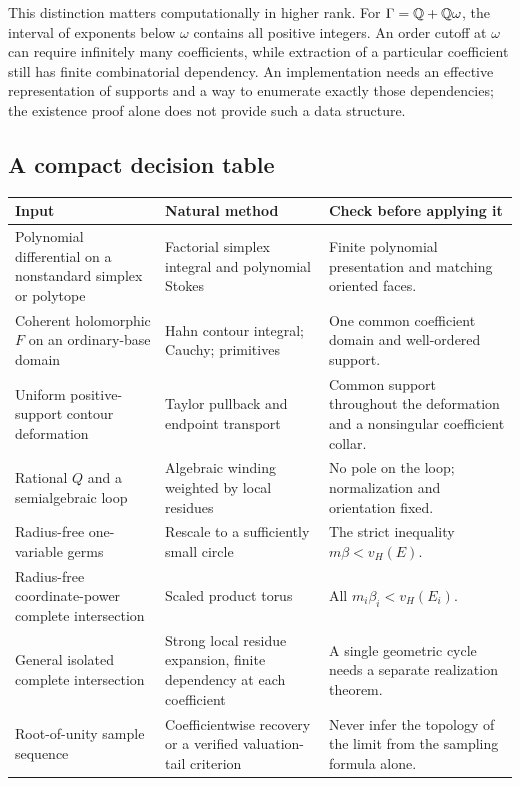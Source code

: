 \documentclass[11pt,letterpaper]{article}
\theoremstyle{definition}
\theoremstyle{remark}
\newcommand{\vH}{v_{\!H}}\newcommand{\re}{\operatorname{Re}}\newcommand{\im}{\operatorname{Im}}
\numberwithin{equation}{section}
\begin{document}
This distinction matters computationally in higher rank. For $\Gamma=\mathbb Q+\mathbb Q\omega$, the interval of exponents below $\omega$ contains all positive integers. An order cutoff at $\omega$ can require infinitely many coefficients, while extraction of a particular coefficient still has finite combinatorial dependency. An implementation needs an effective representation of supports and a way to enumerate exactly those dependencies; the existence proof alone does not provide such a data structure.

\subsection{A compact decision table}
\begin{center}\small
\begin{longtable}{@{}L{0.29\textwidth}L{0.35\textwidth}L{0.26\textwidth}@{}}
\toprule
Input & Natural method & Check before applying it\\\midrule\endhead
Polynomial differential on a nonstandard simplex or polytope & Factorial simplex integral and polynomial Stokes & Finite polynomial presentation and matching oriented faces.\\[0.45em]
Coherent holomorphic $F$ on an ordinary-base domain & Hahn contour integral; Cauchy; primitives & One common coefficient domain and well-ordered support.\\[0.45em]
Uniform positive-support contour deformation & Taylor pullback and endpoint transport & Common support throughout the deformation and a nonsingular coefficient collar.\\[0.45em]
Rational $Q$ and a semialgebraic loop & Algebraic winding weighted by local residues & No pole on the loop; normalization and orientation fixed.\\[0.45em]
Radius-free one-variable germs & Rescale to a sufficiently small circle & The strict inequality $m\beta<\vH(E)$.\\[0.45em]
Radius-free coordinate-power complete intersection & Scaled product torus & All $m_i\beta_i<\vH(E_i)$.\\[0.45em]
General isolated complete intersection & Strong local residue expansion, finite dependency at each coefficient & A single geometric cycle needs a separate realization theorem.\\[0.45em]
Root-of-unity sample sequence & Coefficientwise recovery or a verified valuation-tail criterion & Never infer the topology of the limit from the sampling formula alone.\\
\bottomrule
\end{longtable}
\end{center}
\end{document}
